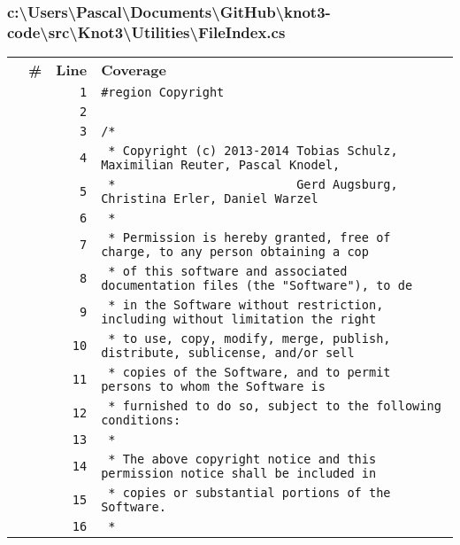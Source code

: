 \documentclass[a4paper,10pt]{article}
\begin{document}
\subsubsection{c:\textbackslash Users\textbackslash Pascal\textbackslash Documents\textbackslash GitHub\textbackslash knot3-code\textbackslash src\textbackslash Knot3\textbackslash Utilities\textbackslash FileIndex.cs}
\begin{longtable}[l]{lrrl}
\textbf{} & \textbf{\#} & \textbf{Line} & \textbf{Coverage}\\
\cellcolor{gray} &  & \verb~1~ & \verb~#region Copyright~\\
\cellcolor{gray} &  & \verb~2~ & \verb~~\\
\cellcolor{gray} &  & \verb~3~ & \verb~/*~\\
\cellcolor{gray} &  & \verb~4~ & \verb~ * Copyright (c) 2013-2014 Tobias Schulz, Maximilian Reuter, Pascal Knodel,~\\
\cellcolor{gray} &  & \verb~5~ & \verb~ *                         Gerd Augsburg, Christina Erler, Daniel Warzel~\\
\cellcolor{gray} &  & \verb~6~ & \verb~ *~\\
\cellcolor{gray} &  & \verb~7~ & \verb~ * Permission is hereby granted, free of charge, to any person obtaining a cop~\\
\cellcolor{gray} &  & \verb~8~ & \verb~ * of this software and associated documentation files (the "Software"), to de~\\
\cellcolor{gray} &  & \verb~9~ & \verb~ * in the Software without restriction, including without limitation the right~\\
\cellcolor{gray} &  & \verb~10~ & \verb~ * to use, copy, modify, merge, publish, distribute, sublicense, and/or sell~\\
\cellcolor{gray} &  & \verb~11~ & \verb~ * copies of the Software, and to permit persons to whom the Software is~\\
\cellcolor{gray} &  & \verb~12~ & \verb~ * furnished to do so, subject to the following conditions:~\\
\cellcolor{gray} &  & \verb~13~ & \verb~ *~\\
\cellcolor{gray} &  & \verb~14~ & \verb~ * The above copyright notice and this permission notice shall be included in ~\\
\cellcolor{gray} &  & \verb~15~ & \verb~ * copies or substantial portions of the Software.~\\
\cellcolor{gray} &  & \verb~16~ & \verb~ *~\\

\end{longtable}
\end{document}
